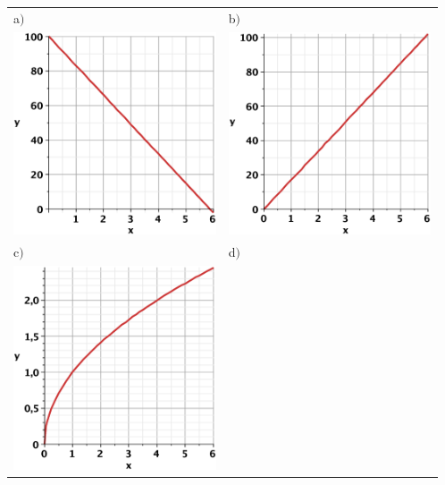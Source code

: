 \documentclass[letterpaper, 12pt]{article}
\begin{document}
\begin{tabular}{l l}
 a$)$ & b$)$ \\

 \includegraphics[width=6cm,height=6cm,bb=20 118 575 673]{Q2076a.eps}

&

 \includegraphics[width=6cm,height=6cm,bb=20 118 575 673]{Q2076b.eps}
\\
c$)$ & d$)$ \\

 \includegraphics[width=6cm,bb=20 118 575 673]{Q2076cv.eps}


\end{tabular}
\end{document}
